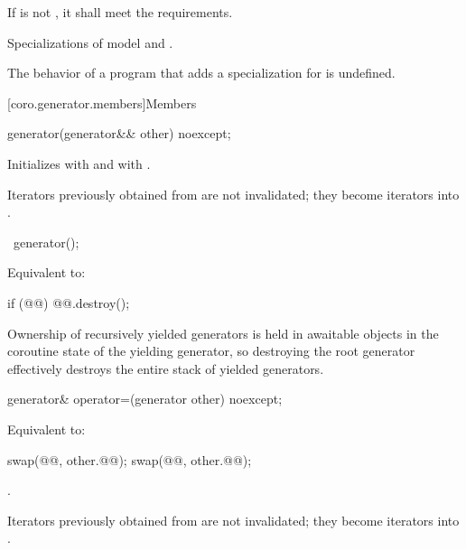 \pnum
If  is not ,
it shall meet the  requirements.

\pnum
Specializations of  model
 and .

\pnum
The behavior of a program that adds a specialization
for  is undefined.

[coro.generator.members]{Members}

%
\begin{itemdecl}
generator(generator&& other) noexcept;
\end{itemdecl}

\begin{itemdescr}
\pnum
\effects
Initializes  with
 and
 with
.

\pnum
\begin{note}
Iterators previously obtained from  are not invalidated;
they become iterators into .
\end{note}
\end{itemdescr}

%
\begin{itemdecl}
~generator();
\end{itemdecl}

\begin{itemdescr}
\pnum
\effects
Equivalent to:
\begin{codeblock}
if (@@) {
  @@.destroy();
}
\end{codeblock}

\pnum
\begin{note}
Ownership of recursively yielded generators
is held in awaitable objects
in the coroutine state of the yielding generator,
so destroying the root generator
effectively destroys the entire stack of yielded generators.
\end{note}
\end{itemdescr}

%
\begin{itemdecl}
generator& operator=(generator other) noexcept;
\end{itemdecl}

\begin{itemdescr}
\pnum
\effects
Equivalent to:
\begin{codeblock}
swap(@@, other.@@);
swap(@@, other.@@);
\end{codeblock}

\pnum
\returns
{}.

\pnum
\begin{note}
Iterators previously obtained from  are not invalidated;
they become iterators into .
\end{note}
\end{itemdescr}


